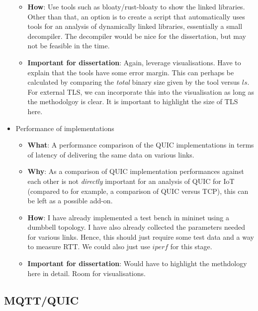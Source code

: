 \documentclass[a4paper,11pt]{article}
\begin{document}
\begin{itemize}
\begin{itemize}
            \item \textbf{How}: Use tools such as bloaty/rust-bloaty to show the linked libraries. Other than that, an option is to create a script that automatically uses tools for an analysis of dynamically linked libraries, essentially a small decompiler. The decompiler would be nice for the dissertation, but may not be feasible in the time.
            \item \textbf{Important for dissertation}: Again, leverage visualisations. Have to explain that the tools have some error margin. This can perhaps be calculated by comparing the \textit{total} binary size given by the tool versus $ls$. For external TLS, we can incorporate this into the visualisation as long as the methodolgoy is clear. It is important to highlight the size of TLS here.
        \end{itemize}
    \item Performance of implementations
        \begin{itemize}
            \item \textbf{What}: A performance comparison of the QUIC implementations in terms of latency of delivering the same data on various links.
            \item \textbf{Why}: As a comparison of QUIC implementation performances against each other is not \textit{directly} important for an analysis of QUIC for IoT (compared to for example, a comparison of QUIC versus TCP), this can be left as a possible add-on.
            \item \textbf{How}: I have already implemented a test bench in mininet using a dumbbell topology. I have also already collected the parameters needed for various links. Hence, this should just require some test data and a way to measure RTT. We could also just use $iperf$ for this stage.
            \item \textbf{Important for dissertation}: Would have to highlight the methdology here in detail. Room for visualisations.
        \end{itemize}
\end{itemize}

\subsection*{MQTT/QUIC}
\end{document}
